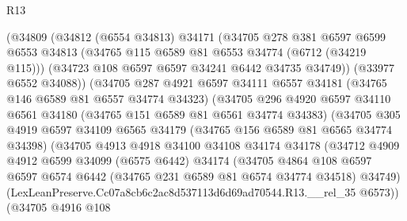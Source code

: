 \begin{lexlean}{R13}
\begin{coremodule}
                    (@34809
                      (@34812
                        (@6554 @34813)
                        @34171
                        (@34705
                          @278
                          @381
                          @6597
                          @6599
                          @6553
                          @34813
                          (@34765 @115 @6589 @81 @6553 @34774 (@6712 (@34219 @115)))
                          (@34723 @108 @6597 @6597 @34241 @6442 @34735 @34749))
                        (@33977 @6552 @34088))
                      (@34705
                        @287
                        @4921
                        @6597
                        @34111
                        @6557
                        @34181
                        (@34765 @146 @6589 @81 @6557 @34774 @34323)
                        (@34705
                          @296
                          @4920
                          @6597
                          @34110
                          @6561
                          @34180
                          (@34765 @151 @6589 @81 @6561 @34774 @34383)
                          (@34705
                            @305
                            @4919
                            @6597
                            @34109
                            @6565
                            @34179
                            (@34765 @156 @6589 @81 @6565 @34774 @34398)
                            (@34705
                              @4913
                              @4918
                              @34100
                              @34108
                              @34174
                              @34178
                              (@34712
                                @4909
                                @4912
                                @6599
                                @34099
                                (@6575 @6442)
                                @34174
                                (@34705
                                  @4864
                                  @108
                                  @6597
                                  @6597
                                  @6574
                                  @6442
                                  (@34765 @231 @6589 @81 @6574 @34774 @34518)
                                  @34749)
                                (LexLeanPreserve.Cc07a8cb6c2ac8d537113d6d69ad70544.R13.__rel_35
                                  @6573))
                              (@34705
                                @4916
                                @108

\end{coremodule}
\end{lexlean}
